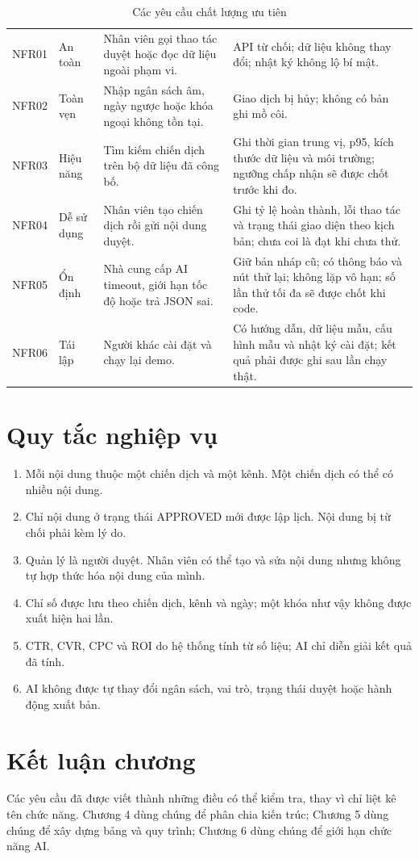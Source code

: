 \begin{table}[h!]
\centering
\small
\caption{Các yêu cầu chất lượng ưu tiên}
\label{tab:v8-quality}
\begin{tabularx}{\textwidth}{|C{1.3cm}|L{2.2cm}|Y|Y|}
\hline
{} &  &  & \\
\hline
NFR01 & An toàn & Nhân viên gọi thao tác duyệt hoặc đọc dữ liệu ngoài phạm vi. & API từ chối; dữ liệu không thay đổi; nhật ký không lộ bí mật.\\
\hline
NFR02 & Toàn vẹn & Nhập ngân sách âm, ngày ngược hoặc khóa ngoại không tồn tại. & Giao dịch bị hủy; không có bản ghi mồ côi.\\
\hline
NFR03 & Hiệu năng & Tìm kiếm chiến dịch trên bộ dữ liệu đã công bố. & Ghi thời gian trung vị, p95, kích thước dữ liệu và môi trường; ngưỡng chấp nhận sẽ được chốt trước khi đo.\\
\hline
NFR04 & Dễ sử dụng & Nhân viên tạo chiến dịch rồi gửi nội dung duyệt. & Ghi tỷ lệ hoàn thành, lỗi thao tác và trạng thái giao diện theo kịch bản; chưa coi là đạt khi chưa thử.\\
\hline
NFR05 & Ổn định & Nhà cung cấp AI timeout, giới hạn tốc độ hoặc trả JSON sai. & Giữ bản nháp cũ; có thông báo và nút thử lại; không lặp vô hạn; số lần thử tối đa sẽ được chốt khi code.\\
\hline
NFR06 & Tái lập & Người khác cài đặt và chạy lại demo. & Có hướng dẫn, dữ liệu mẫu, cấu hình mẫu và nhật ký cài đặt; kết quả phải được ghi sau lần chạy thật.\\
\hline
\end{tabularx}
\end{table}

\section{Quy tắc nghiệp vụ}

\begin{enumerate}
\item Mỗi nội dung thuộc một chiến dịch và một kênh. Một chiến dịch có thể có nhiều nội dung.
\item Chỉ nội dung ở trạng thái APPROVED mới được lập lịch. Nội dung bị từ chối phải kèm lý do.
\item Quản lý là người duyệt. Nhân viên có thể tạo và sửa nội dung nhưng không tự hợp thức hóa nội dung của mình.
\item Chỉ số được lưu theo chiến dịch, kênh và ngày; một khóa như vậy không được xuất hiện hai lần.
\item CTR, CVR, CPC và ROI do hệ thống tính từ số liệu; AI chỉ diễn giải kết quả đã tính.
\item AI không được tự thay đổi ngân sách, vai trò, trạng thái duyệt hoặc hành động xuất bản.
\end{enumerate}

\section{Kết luận chương}

Các yêu cầu đã được viết thành những điều có thể kiểm tra, thay vì chỉ liệt kê tên chức năng. Chương 4 dùng chúng để phân chia kiến trúc; Chương 5 dùng chúng để xây dựng bảng và quy trình; Chương 6 dùng chúng để giới hạn chức năng AI.
